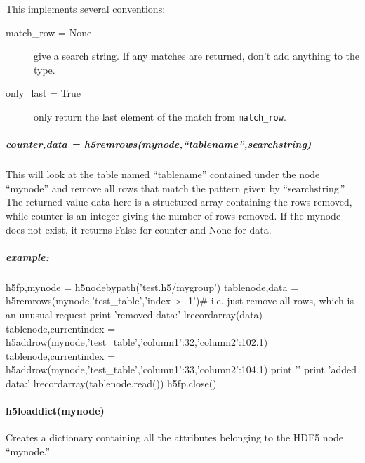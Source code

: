 This implements several conventions:
\begin{mykwargs}
    \begin{description}
        \item[match_row = None] give a search string.  If any matches are returned, don't add anything to the type.
        \item[only_last = True] only return the last element of the match from \texttt{match\_row}.
    \end{description}
\end{mykwargs}
\subparagraph{counter,data = h5remrows(mynode,``tablename'',searchstring)}
This will look at the table named ``tablename'' contained
    under the node ``mynode'' and remove all rows that match
    the pattern given by ``searchstring.''
The returned value data here is a structured array containing
    the rows removed, while counter is an integer giving the
    number of rows removed.
If the mynode does not exist, it returns False for counter
    and None for data.
\subparagraph{\textit{example:}}
\begin{python}
h5fp,mynode = h5nodebypath('test.h5/mygroup')
tablenode,data = h5remrows(mynode,'test_table','index > -1')# i.e. just remove all rows, which is an unusual request
print 'removed data:\n\n'
lrecordarray(data)
tablenode,currentindex = h5addrow(mynode,'test_table',{'column1':32,'column2':102.1})
tablenode,currentindex = h5addrow(mynode,'test_table',{'column1':33,'column2':104.1})
print '\n\n'
print 'added data:\n\n'
lrecordarray(tablenode.read())
h5fp.close()
\end{python}
\paragraph{h5loaddict(mynode)}
Creates a dictionary containing all the attributes
    belonging to the HDF5 node ``mynode.''

